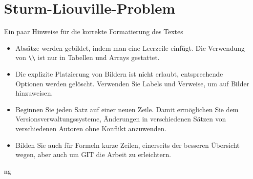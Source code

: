 %
%
%
\chapter{Sturm-Liouville-Problem\label{chapter:sturmliouville}}
\begin{refsection}

Ein paar Hinweise für die korrekte Formatierung des Textes
\begin{itemize}
\item
Absätze werden gebildet, indem man eine Leerzeile einfügt.
Die Verwendung von \verb+\\+ ist nur in Tabellen und Arrays gestattet.
\item
Die explizite Platzierung von Bildern ist nicht erlaubt, entsprechende
Optionen werden gelöscht. 
Verwenden Sie Labels und Verweise, um auf Bilder hinzuweisen.
\item
Beginnen Sie jeden Satz auf einer neuen Zeile. 
Damit ermöglichen Sie dem Versionsverwaltungssysteme, Änderungen
in verschiedenen Sätzen von verschiedenen Autoren ohne Konflikt 
anzuwenden.
\item 
Bilden Sie auch für Formeln kurze Zeilen, einerseits der besseren
Übersicht wegen, aber auch um GIT die Arbeit zu erleichtern.
\end{itemize}


ng


\printbibliography[heading=subbibliography]
\end{refsection}

